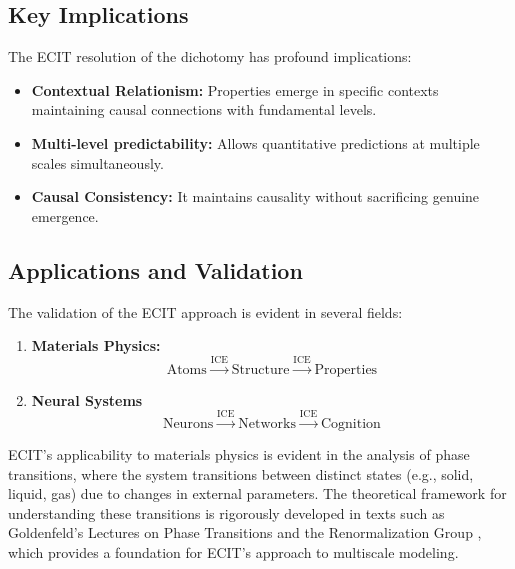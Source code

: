 \documentclass{article}
\begin{document}
\subsection{Key Implications}

The ECIT resolution of the dichotomy has profound implications:

\begin{itemize}
    \item \textbf{Contextual Relationism:} Properties emerge in specific contexts maintaining causal connections with fundamental levels.
    
    \item \textbf{Multi-level predictability:} Allows quantitative predictions at multiple scales simultaneously.
    
    \item \textbf{Causal Consistency:} It maintains causality without sacrificing genuine emergence.
\end{itemize}

\subsection{Applications and Validation}

The validation of the ECIT approach is evident in several fields:
\begin{enumerate}
    \item \textbf{Materials Physics:}
    \begin{equation}
    \text{Atoms} \xrightarrow{\text{ICE}} \text{Structure} \xrightarrow{\text{ICE}} \text{Properties}
    \end{equation}
    
    \item \textbf{Neural Systems}
    \begin{equation}
    \text{Neurons} \xrightarrow{\text{ICE}} \text{Networks} \xrightarrow{\text{ICE}} \text{Cognition}
    \end{equation}
\end{enumerate}

\bigskip
\noindent ECIT's applicability to materials physics is evident in the analysis of phase transitions, where the system transitions between distinct states (e.g., solid, liquid, gas) due to changes in external parameters. The theoretical framework for understanding these transitions is rigorously developed in texts such as Goldenfeld's Lectures on Phase Transitions and the Renormalization Group \cite{Goldenfeld2018}, which provides a foundation for ECIT's approach to multiscale modeling.
\end{document}
